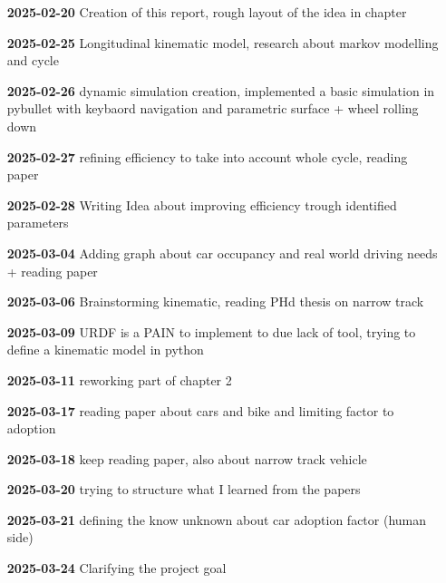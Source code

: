 \begin{itemize}[leftmargin=1.5cm,label={}]
    \item[\textbf{2025-02-20}] Creation of this report, rough layout of the idea in chapter
    
    \item[\textbf{2025-02-25}] Longitudinal kinematic model, research about markov modelling and cycle
    
    \item[\textbf{2025-02-26}] dynamic simulation creation, implemented a basic simulation in pybullet with keybaord navigation and parametric surface + wheel rolling down
    
    \item[\textbf{2025-02-27}] refining efficiency to take into account whole cycle, reading paper
    
    \item[\textbf{2025-02-28}] Writing Idea about improving efficiency trough identified parameters

    \item[\textbf{2025-03-04}] Adding graph about car occupancy and real world driving needs + reading paper

    \item[\textbf{2025-03-06}] Brainstorming kinematic, reading PHd thesis on narrow track

    \item[\textbf{2025-03-09}] URDF is a PAIN to implement to due lack of tool, trying to define a kinematic model in python

    \item[\textbf{2025-03-11}] reworking part of chapter 2

    \item[\textbf{2025-03-17}] reading paper about cars and bike and limiting factor to adoption

    \item[\textbf{2025-03-18}] keep reading paper, also about narrow track vehicle

    \item[\textbf{2025-03-20}] trying to structure what I learned from the papers

    \item[\textbf{2025-03-21}] defining the know unknown about car adoption factor (human side)

    \item[\textbf{2025-03-24}] Clarifying the project goal 


\end{itemize}
